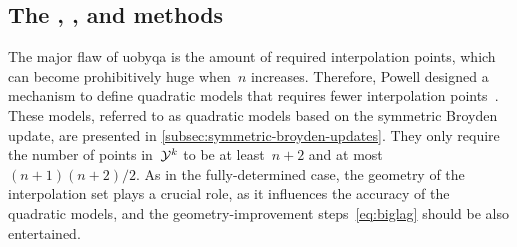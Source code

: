 \subsection{The , , and  methods}
\label{subsec:newuoa-bobyqa-lincoa}

The major flaw of \gls{uobyqa} is the amount of required interpolation points, which can become prohibitively huge when~$n$ increases.
Therefore, Powell designed a mechanism to define quadratic models that requires fewer interpolation points~\cite{Powell_2004a}.
These models, referred to as quadratic models based on the symmetric Broyden update, are presented in \cref{subsec:symmetric-broyden-updates}.
They only require the number of points in~$\xpt[k]$ to be at least~$n + 2$ and at most~$(n + 1)(n + 2) / 2$.
As in the fully-determined case, the geometry of the interpolation set plays a crucial role, as it influences the accuracy of the quadratic models, and the geometry-improvement steps~\cref{eq:biglag} should be also entertained.

